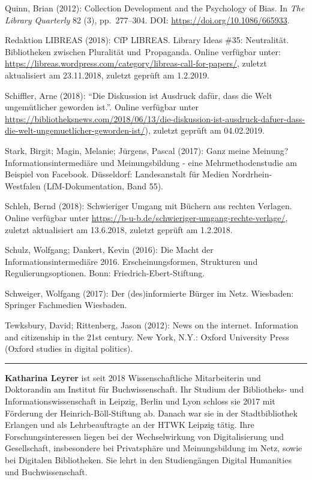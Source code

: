 \documentclass[a4paper,
fontsize=11pt,
oneside,
numbers=noperiodatend,
parskip=half-,
bibliography=totoc,
final
]{scrartcl}
\begin{document}
Quinn, Brian (2012): Collection Development and the Psychology of Bias.
In \emph{The Library Quarterly} 82 (3), pp.~277--304. DOI:
\url{https://doi.org/10.1086/665933}.

Redaktion LIBREAS (2018): CfP LIBREAS. Library Ideas \#35: Neutralität.
Bibliotheken zwischen Pluralität und~Propaganda. Online verfügbar unter:
\url{https://libreas.wordpress.com/category/libreas-call-for-papers/},
zuletzt aktualisiert am 23.11.2018, zuletzt geprüft am 1.2.2019.

Schiffler, Arne (2018): \enquote{Die Diskussion ist Ausdruck dafür, dass
die Welt ungemütlicher geworden ist.}. Online verfügbar unter
\url{https://bibliotheksnews.com/2018/06/13/die-diskussion-ist-ausdruck-dafuer-dass-die-welt-ungemuetlicher-geworden-ist/}),
zuletzt geprüft am 04.02.2019.

Stark, Birgit; Magin, Melanie; Jürgens, Pascal (2017): Ganz meine
Meinung? Informationsintermediäre und Meinungsbildung - eine
Mehrmethodenstudie am Beispiel von Facebook. Düsseldorf: Landesanstalt
für Medien Nordrhein-Westfalen (LfM-Dokumentation, Band 55).

Schleh, Bernd (2018): Schwieriger Umgang mit Büchern aus rechten
Verlagen. Online verfügbar unter
\url{https://b-u-b.de/schwieriger-umgang-rechte-verlage/}, zuletzt
aktualisiert am 13.6.2018, zuletzt geprüft am 1.2.2018.

Schulz, Wolfgang; Dankert, Kevin (2016): Die Macht der
Informationsintermediäre 2016. Erscheinungsformen, Strukturen und
Regulierungsoptionen. Bonn: Friedrich-Ebert-Stiftung.

Schweiger, Wolfgang (2017): Der (des)informierte Bürger im Netz.
Wiesbaden: Springer Fachmedien Wiesbaden.

Tewksbury, David; Rittenberg, Jason (2012): News on the internet.
Information and citizenship in the 21st century. New York, N.Y.: Oxford
University Press (Oxford studies in digital politics).

\begin{center}\rule{0.5\linewidth}{\linethickness}\end{center}

\textbf{Katharina Leyrer} ist seit 2018 Wissenschaftliche Mitarbeiterin
und Doktorandin am Institut für Buchwissenschaft. Ihr Studium der
Bibliotheks- und Informationswissenschaft in Leipzig, Berlin und Lyon
schloss sie 2017 mit Förderung der Heinrich-Böll-Stiftung ab. Danach war
sie in der Stadtbibliothek Erlangen und als Lehrbeauftragte an der HTWK
Leipzig tätig. Ihre Forschungsinteressen liegen bei der Wechselwirkung
von Digitalisierung und Gesellschaft, insbesondere bei Privatsphäre und
Meinungsbildung im Netz, sowie bei Digitalen Bibliotheken. Sie lehrt in
den Studiengängen Digital Humanities und Buchwissenschaft.
\end{document}
